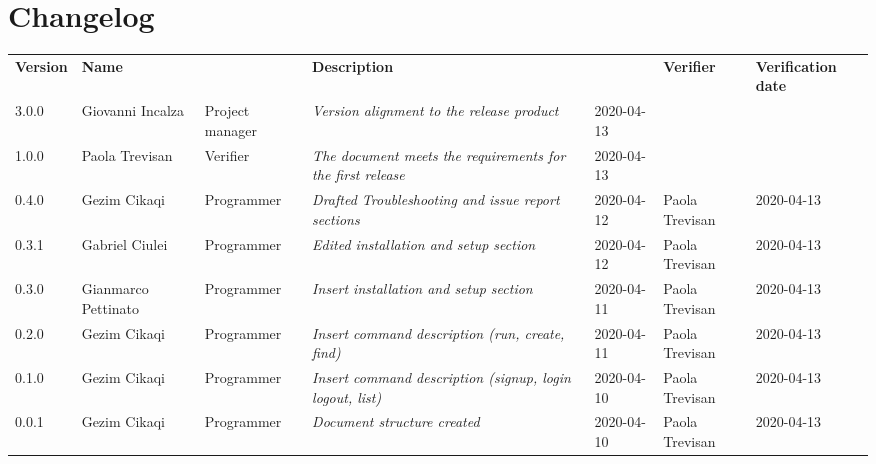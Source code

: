 \section*{Changelog}
\renewcommand{\arraystretch}{1.8}
  \setlength\LTleft{-1.7cm}
  \begin{longtable}{|p{1.7cm}|p{2cm}|p{2.5cm}|p{3cm}|p{1.7cm}|p{2cm}|p{2.3cm}|}
    \hline
    \rowcolor{header}
    \textbf{Version} & \textbf{Name} & \centering{\textbf{Role}} & \textbf{Description} &      \centering{\textbf{Date}} & \textbf{Verifier} & \textbf{Verification date} \\
    3.0.0 & Giovanni Incalza & Project manager & \small{\textit{Version alignment to the release product}} & 2020-04-13 & & \\
    
    1.0.0 & Paola Trevisan & Verifier & \small{\textit{The document meets the requirements for the first release}} & 2020-04-13 & & \\
    
    0.4.0 & Gezim Cikaqi & Programmer & \small{\textit{Drafted Troubleshooting and issue report sections}} & 2020-04-12 & Paola Trevisan & 2020-04-13 \\
    
    0.3.1 & Gabriel Ciulei  & Programmer & \small{\textit{Edited installation and setup section}} & 2020-04-12 & Paola Trevisan & 2020-04-13 \\
    
    0.3.0 & Gianmarco Pettinato  & Programmer & \small{\textit{Insert installation and setup section}} & 2020-04-11 & Paola Trevisan & 2020-04-13 \\
    
    0.2.0 & Gezim Cikaqi  & Programmer & \small{\textit{Insert command description (run, create, find)}} & 2020-04-11 & Paola Trevisan & 2020-04-13 \\
    
	0.1.0 & Gezim Cikaqi  & Programmer & \small{\textit{Insert command description (signup, login logout, list)}} & 2020-04-10 & Paola Trevisan & 2020-04-13 \\
    
    0.0.1 & Gezim Cikaqi  & Programmer & \small{\textit{Document structure created}} & 2020-04-10 & Paola Trevisan & 2020-04-13\\

    \hline
  \end{longtable}
\setlength\LTleft{0cm}
\restoregeometry
